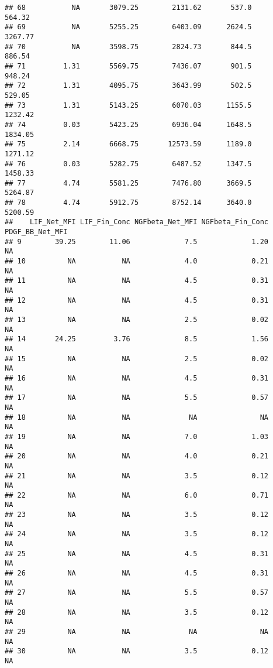 \documentclass[]{article}
\begin{document}
\begin{verbatim}
## 68           NA       3079.25        2131.62       537.0       564.32
## 69           NA       5255.25        6403.09      2624.5      3267.77
## 70           NA       3598.75        2824.73       844.5       886.54
## 71         1.31       5569.75        7436.07       901.5       948.24
## 72         1.31       4095.75        3643.99       502.5       529.05
## 73         1.31       5143.25        6070.03      1155.5      1232.42
## 74         0.03       5423.25        6936.04      1648.5      1834.05
## 75         2.14       6668.75       12573.59      1189.0      1271.12
## 76         0.03       5282.75        6487.52      1347.5      1458.33
## 77         4.74       5581.25        7476.80      3669.5      5264.87
## 78         4.74       5912.75        8752.14      3640.0      5200.59
##    LIF_Net_MFI LIF_Fin_Conc NGFbeta_Net_MFI NGFbeta_Fin_Conc PDGF_BB_Net_MFI
## 9        39.25        11.06             7.5             1.20              NA
## 10          NA           NA             4.0             0.21              NA
## 11          NA           NA             4.5             0.31              NA
## 12          NA           NA             4.5             0.31              NA
## 13          NA           NA             2.5             0.02              NA
## 14       24.25         3.76             8.5             1.56              NA
## 15          NA           NA             2.5             0.02              NA
## 16          NA           NA             4.5             0.31              NA
## 17          NA           NA             5.5             0.57              NA
## 18          NA           NA              NA               NA              NA
## 19          NA           NA             7.0             1.03              NA
## 20          NA           NA             4.0             0.21              NA
## 21          NA           NA             3.5             0.12              NA
## 22          NA           NA             6.0             0.71              NA
## 23          NA           NA             3.5             0.12              NA
## 24          NA           NA             3.5             0.12              NA
## 25          NA           NA             4.5             0.31              NA
## 26          NA           NA             4.5             0.31              NA
## 27          NA           NA             5.5             0.57              NA
## 28          NA           NA             3.5             0.12              NA
## 29          NA           NA              NA               NA              NA
## 30          NA           NA             3.5             0.12              NA

\end{verbatim}
\end{document}
